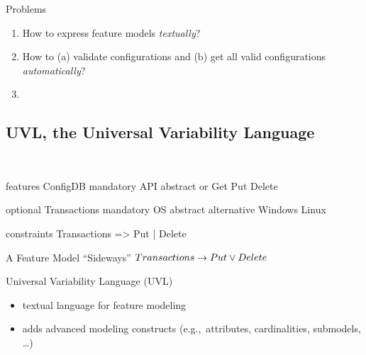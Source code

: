 \begin{frame}{\myframetitle}
\begin{mycolumns}[b]

		\begin{note}{Problems}
			\begin{enumerate}
				\item<3->[P1] How to express feature models \emph{textually}?
				\item<4->[P2] How to (a) validate configurations and (b) get all valid configurations \emph{automatically}?
				\item<5->[P3] \color{gray}{(How to reverse engineer feature models?)}
			\end{enumerate}
		\end{note}
	\end{mycolumns}
\end{frame}

\subsection{UVL, the Universal Variability Language}

\begin{frame}[fragile]{\myframetitle\ \mytitlesource{\uvlwebsite}}
	\begin{mycolumns}
\begin{uvltight}[basicstyle=\normalsize]{}
features
	ConfigDB
		mandatory
			API {abstract}
				or
					Get
					Put
					Delete

		optional
			Transactions
		mandatory
			OS {abstract}
				alternative
					Windows
					Linux

constraints
	Transactions => Put | Delete
\end{uvltight}
	\mynextcolumn
		\begin{exampletight}{A Feature Model ``Sideways''}
			\centering
			$Transactions \rightarrow Put \vee Delete$
		\end{exampletight}
		\begin{note}{Universal Variability Language (UVL)}
			\begin{itemize}
				\item textual language for feature modeling
				\item adds advanced modeling constructs (e.g.,~attributes, cardinalities, submodels, \ldots)
			\end{itemize}
		\end{note}
	\end{mycolumns}
\end{frame}

